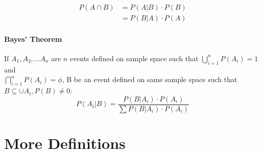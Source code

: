\documentclass[
10pt, %
a4paper, %
]{report}
\begin{document}
\begin{align*}
    P(A\cap B) &= P(A|B) \cdot P(B) \\
               &= P(B|A) \cdot P(A)
\end{align*}

\paragraph{Bayes' Theorem}
If \(A_1, A_2, \dots A_n\) are \(n\) events defined on sample space such that \(\bigcup_{i=1}^n P(A_i)=1\) and \\ \(\bigcap_{i=1}^n P(A_i)=\phi\), B be an event defined on same sample space such that \(B\subseteq \cup A_i, P(B)\neq 0\):
\[
P(A_i| B) = \frac{P(B|A_i)\cdot P(A_i)}{\sum P(B|A_i)\cdot P(A_i)}
\]

\section{More Definitions}
\end{document}
